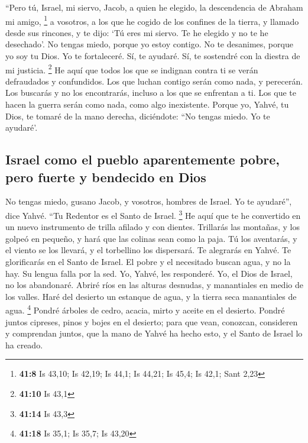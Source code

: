 \begin{paracol}{2}
 ``Pero tú, Israel, mi siervo, Jacob, a quien he elegido,
la descendencia de Abraham mi amigo, \footnote{\textbf{41:8} Is 43,10;
  Is 42,19; Is 44,1; Is 44,21; Is 45,4; Is 42,1; Sant 2,23}
 a vosotros, a los que he cogido de los confines de la
tierra, y llamado desde sus rincones, y te dijo: `Tú eres mi siervo. Te
he elegido y no te he desechado'.  No tengas miedo,
porque yo estoy contigo. No te desanimes, porque yo soy tu Dios. Yo te
fortaleceré. Sí, te ayudaré. Sí, te sostendré con la diestra de mi
justicia. \footnote{\textbf{41:10} Is 43,1}  He aquí que
todos los que se indignan contra ti se verán defraudados y confundidos.
Los que luchan contigo serán como nada, y perecerán.  Los
buscarás y no los encontrarás, incluso a los que se enfrentan a ti. Los
que te hacen la guerra serán como nada, como algo inexistente.
 Porque yo, Yahvé, tu Dios, te tomaré de la mano derecha,
diciéndote: ``No tengas miedo. Yo te ayudaré'.

\hypertarget{israel-como-el-pueblo-aparentemente-pobre-pero-fuerte-y-bendecido-en-dios}{%
\subsection{Israel como el pueblo aparentemente pobre, pero fuerte y
bendecido en
Dios}\label{israel-como-el-pueblo-aparentemente-pobre-pero-fuerte-y-bendecido-en-dios}}

 No tengas miedo, gusano Jacob, y vosotros, hombres de
Israel. Yo te ayudaré'', dice Yahvé. ``Tu Redentor es el Santo de
Israel. \footnote{\textbf{41:14} Is 43,3}  He aquí que te
he convertido en un nuevo instrumento de trilla afilado y con dientes.
Trillarás las montañas, y los golpeó en pequeño, y hará que las colinas
sean como la paja.  Tú los aventarás, y el viento se los
llevará, y el torbellino los dispersará. Te alegrarás en Yahvé. Te
glorificarás en el Santo de Israel.  El pobre y el
necesitado buscan agua, y no la hay. Su lengua falla por la sed. Yo,
Yahvé, les responderé. Yo, el Dios de Israel, no los abandonaré.
 Abriré ríos en las alturas desnudas, y manantiales en
medio de los valles. Haré del desierto un estanque de agua, y la tierra
seca manantiales de agua. \footnote{\textbf{41:18} Is 35,1; Is 35,7; Is
  43,20}  Pondré árboles de cedro, acacia, mirto y aceite
en el desierto. Pondré juntos cipreses, pinos y bojes en el desierto;
 para que vean, conozcan, consideren y comprendan juntos,
que la mano de Yahvé ha hecho esto, y el Santo de Israel lo ha creado.


\end{paracol}
